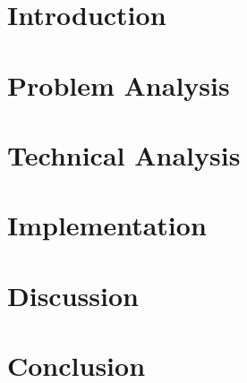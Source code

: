 \documentclass[11pt,twoside,titlepage]{report}
\begin{document}
\lhead[\fancyplain{}{\textit{\leftmark}}]{}
\rhead[]{\fancyplain{}{\textit{\leftmark}}}

\thispagestyle{empty}
\newpage
\cleardoublepage
\newpage
\thispagestyle{empty}


\newpage
\thispagestyle{empty}


\cleardoublepage
{}
\renewcommand{\thepage}{\arabic{page}}%
\thispagestyle{empty}
\tableofcontents
\printglossary[type=\acronymtype,nogroupskip,nonumberlist,title=Abbreviations]
\clearpage{\pagestyle{empty}\cleardoublepage}


\chapter{Introduction}
\label{sec:intro}

\chapter{Problem Analysis} \label{sec:problemanalysis}



\chapter{Technical Analysis}




%


\chapter{Implementation}




\chapter{Discussion}

\chapter{Conclusion}
\end{document}
